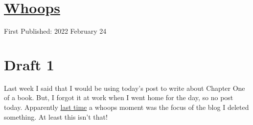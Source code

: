 \documentclass[12pt]{article}[titlepage]
\newcommand{\1}{\={a}}
\newcommand{\2}{\={e}}
\newcommand{\3}{\={\i}}
\newcommand{\4}{\=o}
\newcommand{\5}{\=u}
\newcommand{\6}{\={A}}
\renewcommand{\,}{\textsuperscript{,}}
\begin{document}
\doublespacing
\section{\href{whoops-2.html}{Whoops}}
First Published: 2022 February 24

\section{Draft 1}
Last week I said that I would be using today's post to write about Chapter One of a book.
But, I forgot it at work when I went home for the day, so no post today.
Apparently \href{whoops.html}{last time} a whoops moment was the focus of the blog I deleted something.
At least this isn't that!
\end{document}
